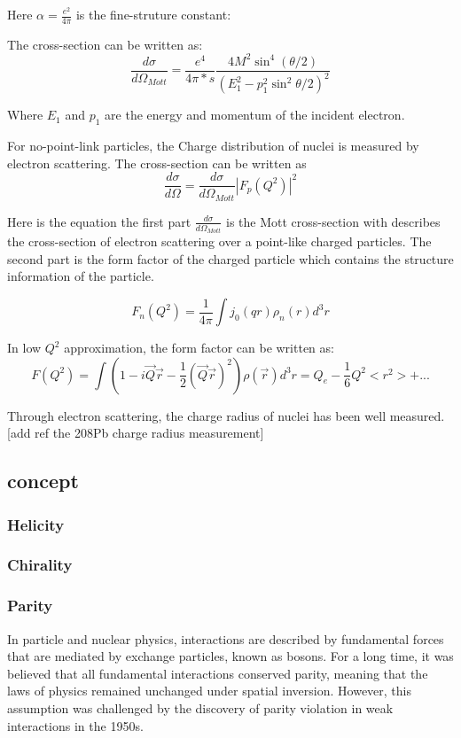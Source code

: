 Here $\alpha = \frac{e^2}{4\pi}$ is the fine-struture constant:

The cross-section can be written as:
\begin{equation}
      \frac{d\sigma}{d\Omega_{Mott}} =   \frac{e^4}{4\pi*s} \frac{4M^2\sin^4{(\theta/2)}}{(E_1^2 - p_1^2\sin^2{\theta/2})^2}
\end{equation}

Where $E_1$ and $p_1$ are the energy and momentum of the incident electron. 


For no-point-link particles, the Charge distribution of nuclei is measured by electron scattering. The cross-section can be written as
\begin{equation}
    \frac{d\sigma}{d\Omega} = \frac{d\sigma}{d\Omega_{Mott}}|F_p(Q^2)|^2
\end{equation}

Here is the equation the first part $\frac{d\sigma}{d\Omega_{Mott}}$ is the Mott cross-section with describes the cross-section of electron scattering over a point-like charged particles. The second part is the form factor of the charged particle which contains the structure information of the particle. 


\begin{equation}
    F_n(Q^2) = \frac{1}{4\pi}\int{j_0(qr)\rho_n(r)}d^3r
\end{equation}

In low $Q^2$ approximation, the form factor can be written as:
\begin{equation}
    F(Q^2) = \int{(1-i\Vec{Q}\Vec{r} - \frac{1}{2}(\Vec{Q}\Vec{r})^2)\rho(\Vec{r})}d^3r = Q_e - \frac{1}{6}Q^2<r^2> + ...
\end{equation}

Through electron scattering, the charge radius of nuclei has been well measured. [add ref the 208Pb charge radius measurement]

\subsection{concept}
\subsubsection{Helicity}
\subsubsection{Chirality}
\subsubsection{Parity}
In particle and nuclear physics, interactions are described by fundamental forces that are mediated by exchange particles, known as bosons. For a long time, it was believed that all fundamental interactions conserved parity, meaning that the laws of physics remained unchanged under spatial inversion. However, this assumption was challenged by the discovery of parity violation in weak interactions in the 1950s.

